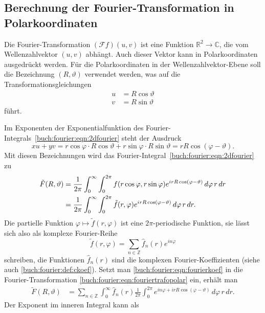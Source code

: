 \subsection{Berechnung der Fourier-Transformation in Polarkoordinaten}
Die Fourier-Transformation $(\mathscr{F}f)(u,v)$ ist eine Funktion
$\mathbb{R}^2\to\mathbb{C}$, die vom Wellenzahlvektor $(u,v)$ abhängt.
%
Auch dieser Vektor kann in Polarkoordinaten ausgedrückt werden.
Für die Polarkoordinaten in der Wellenzahlvektor-Ebene soll die Bezeichnung
$(R,\vartheta)$ verwendet werden, was auf die Transformationsgleichungen
\begin{align*}
u&=R\cos\vartheta\\
v&=R\sin\vartheta
\end{align*}
führt.

Im Exponenten der Exponentialfunktion
des Fourier-Integrals~\eqref{buch:fourier:eqn:2dfourier}
%
steht der Ausdruck
\[
xu+yv
=
r\cos\varphi\cdot R\cos\vartheta
+
r\sin\varphi\cdot R\sin\vartheta
=
rR\cos(\varphi-\vartheta).
\]
Mit diesen Bezeichnungen wird das
Fourier-Integral~\eqref{buch:fourier:eqn:2dfourier}
zu
\begin{align}
\tilde{F}(R,\vartheta)
&=
\frac{1}{2\pi}
\int_{0}^{\infty}
\int_{0}^{2\pi}
f(r\cos\varphi,r\sin\varphi)
e^{irR\cos(\varphi-\vartheta)}
\,d\varphi\,r\, dr
\notag
\\
&=
\frac{1}{2\pi}
\int_{0}^{\infty}
\int_{0}^{2\pi}
\tilde{f}(r,\varphi)
e^{irR\cos(\varphi-\vartheta)}
\,d\varphi\,r\, dr.
\label{buch:fourier:eqn:fouriertrafopolar}
\end{align}
Die partielle Funktion $\varphi\mapsto \tilde{f}(r,\varphi)$
ist eine $2\pi$-periodische Funktion, sie lässt sich also als
komplexe Fourier-Reihe
\begin{equation}
\tilde{f}(r,\varphi)
=
\sum_{n\in\mathbb{Z}} \hat{f}_n(r) e^{in\varphi}
\label{buch:fourier:eqn:fourierkoef}
\end{equation}
schreiben, die Funktionen $\hat{f}_n(r)$ sind die komplexen
Fourier-Koeffizienten (siehe auch \eqref{buch:fourier:def:ckoef}).
Setzt man \eqref{buch:fourier:eqn:fourierkoef} in die Fourier-Transformation
\eqref{buch:fourier:eqn:fouriertrafopolar} ein, erhält man
\begin{align*}
\tilde{F}(R,\vartheta)
&=
\sum_{n\in\mathbb{Z}}
\int_0^\infty
\hat{f}_n(r)
\frac{1}{2\pi}
\int_0^{2\pi}
e^{in\varphi+irR\cos(\varphi-\vartheta)}
\,d\varphi
\,
r\,dr.
\end{align*}
Der Exponent im inneren Integral kann als
